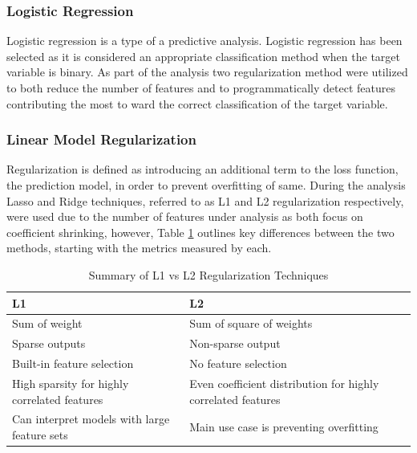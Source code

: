 \subsubsection{Logistic Regression}
Logistic regression is a type of a predictive analysis. Logistic regression has been selected as it is considered an appropriate classification method when the target variable is binary\cite{Hastie2009OnLogisticRegForBinaryTargetClass}. 
As part of the analysis two regularization method were utilized to both reduce the number of features and to programmatically detect features contributing the most to ward the correct classification of the target variable. 

\subsubsection{Linear Model Regularization} 
Regularization is defined as introducing an additional term to the loss function, the prediction model, in order to prevent overfitting of same. During the analysis Lasso and Ridge techniques, referred to as L1 and L2 regularization respectively, were used due to the number of features under analysis as both focus on coefficient shrinking, however, Table \ref{tab:regularization_l1_vs_l2} outlines key differences between the two methods, starting with the metrics measured by each.
\begin{table}[h!]
\centering
\begin{tabular}{@{}ll@{}}
\toprule
L1                                                 & L2                                                           \\ \midrule
Sum of weight                                      & Sum of square of weights                                     \\
Sparse outputs                                     & Non-sparse output                                            \\
Built-in feature selection                         & No feature selection                                         \\
High sparsity for highly correlated features       & Even coefficient distribution 
for highly correlated features \\
Can  interpret models with large feature sets & Main use case is preventing overfitting                      \\ \bottomrule
\end{tabular}
\caption{Summary of L1 vs L2 Regularization Techniques}
\label{tab:regularization_l1_vs_l2}
\end{table}

